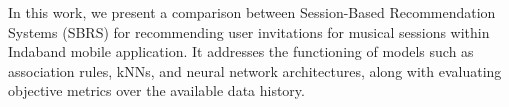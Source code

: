 \documentclass[tcc,numbers]{coppe}
\begin{document}
  \begin{foreignabstract}

  In this work, we present a comparison between Session-Based Recommendation
  Systems (SBRS) for recommending user invitations for musical sessions within
  Indaband mobile application. It addresses the functioning of models such as
  association rules, kNNs, and neural network architectures, along with
  evaluating objective metrics over the available data history.

  \end{foreignabstract}

  \tableofcontents
  \listoffigures
  \listoftables
  \printlosymbols
  \printloabbreviations
  \mainmatter
  

  

  

  

  

  \backmatter
  
  
  

  \appendix
\end{document}
